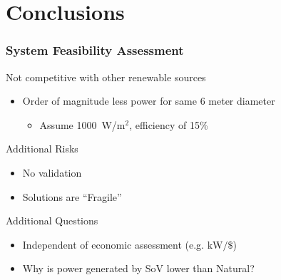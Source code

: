 \documentclass[mathserif]{beamer}
\begin{document}
%
%
\section{Conclusions}
\begin{frame}
 \frametitle{System Feasibility Assessment}

 \begin{block}{Not competitive with other renewable sources}
 \begin{itemize}
 \item Order of magnitude less power for same 6 meter diameter
 \begin{itemize}
   \item Assume 1000~W/$\text{m}^2$, efficiency of 15\%
 \end{itemize}
 \end{itemize}
 \end{block}


 \begin{block}{Additional Risks}
 \begin{itemize}
 \item No validation
 \item Solutions are ``Fragile''
 \end{itemize}
 \end{block}

 \begin{block}{Additional Questions}
 \begin{itemize}
 \item Independent of economic assessment (e.g. $\text{kW}/\$$)
 \item Why is power generated by SoV lower than Natural?
 \end{itemize}
 \end{block}


\end{frame}
\end{document}
